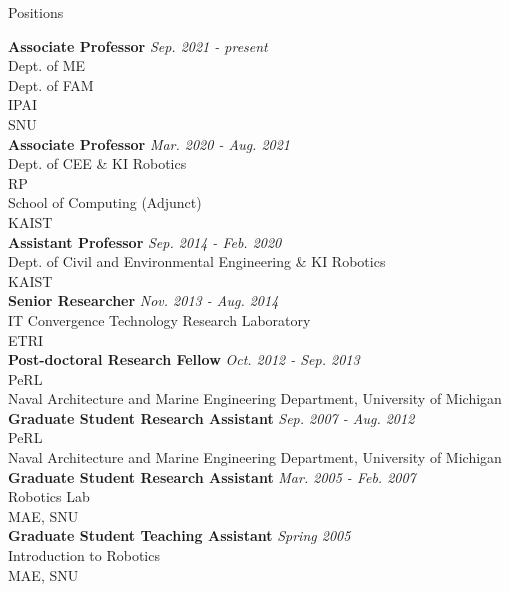 \begin{rSection}{Positions}

{\bf Associate Professor} \hfill {\em Sep. 2021 - present} \\
Dept. of \ac{ME}\\
Dept. of \ac{FAM}\\
\ac{IPAI}\\
\acf{SNU}\\

{\bf Associate Professor} \hfill {\em Mar. 2020 - Aug. 2021} \\
Dept. of \ac{CEE} \& KI Robotics\\
\ac{RP}\\
School of Computing (Adjunct)\\
\acf{KAIST}\\

{\bf Assistant Professor} \hfill {\em Sep. 2014 - Feb. 2020} \\
Dept. of Civil and Environmental Engineering \& KI Robotics\\
\acf{KAIST}\\

{\bf Senior Researcher} \hfill {\em Nov. 2013 - Aug. 2014} \\
IT Convergence Technology Research Laboratory\\
\acf{ETRI}\\

{\bf Post-doctoral Research Fellow} \hfill {\em Oct. 2012 - Sep. 2013} \\
\acf{PeRL}\\
Naval Architecture and Marine Engineering Department, University of Michigan\\

{\bf Graduate Student Research Assistant} \hfill {\em Sep. 2007 - Aug. 2012} \\
\acf{PeRL}\\
Naval Architecture and Marine Engineering Department, University of Michigan\\

{\bf Graduate Student Research Assistant} \hfill {\em Mar. 2005 - Feb. 2007} \\
Robotics Lab\\
\acf{MAE}, \acf{SNU}\\

{\bf Graduate Student Teaching Assistant} \hfill {\em Spring 2005} \\
Introduction to Robotics\\
\acf{MAE}, \acf{SNU}\\

\end{rSection}
